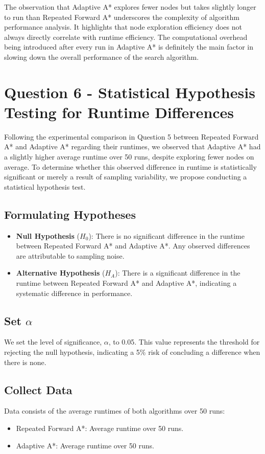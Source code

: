 \documentclass{article}
\begin{document}
The observation that Adaptive A* explores fewer nodes but takes slightly longer to run than Repeated Forward A* underscores the complexity of algorithm performance analysis. It highlights that node exploration efficiency does not always directly correlate with runtime efficiency. The computational overhead being introduced after every run in Adaptive A* is definitely the main factor in slowing down the overall performance of the search algorithm.


\section{Question 6 - Statistical Hypothesis Testing for Runtime Differences}

Following the experimental comparison in Question 5 between Repeated Forward A* and Adaptive A* regarding their runtimes, we observed that Adaptive A* had a slightly higher average runtime over 50 runs, despite exploring fewer nodes on average. To determine whether this observed difference in runtime is statistically significant or merely a result of sampling variability, we propose conducting a statistical hypothesis test.

\subsection{Formulating Hypotheses}

\begin{itemize}
    \item \textbf{Null Hypothesis} (\(H_0\)): There is no significant difference in the runtime between Repeated Forward A* and Adaptive A*. Any observed differences are attributable to sampling noise.
    \item \textbf{Alternative Hypothesis} (\(H_A\)): There is a significant difference in the runtime between Repeated Forward A* and Adaptive A*, indicating a systematic difference in performance.
\end{itemize}

\subsection{Set \(\alpha\)}
We set the level of significance, \(\alpha\), to 0.05. This value represents the threshold for rejecting the null hypothesis, indicating a 5\% risk of concluding a difference when there is none.

\subsection{Collect Data}
Data consists of the average runtimes of both algorithms over 50 runs:
\begin{itemize}
    \item Repeated Forward A*: Average runtime over 50 runs.
    \item Adaptive A*: Average runtime over 50 runs.
\end{itemize}
\end{document}
